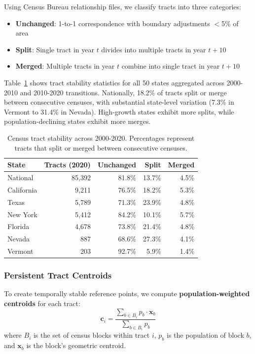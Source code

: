 Using Census Bureau relationship files, we classify tracts into three categories:
\begin{itemize}
    \item \textbf{Unchanged}: 1-to-1 correspondence with boundary adjustments $<$5\% of area
    \item \textbf{Split}: Single tract in year $t$ divides into multiple tracts in year $t+10$
    \item \textbf{Merged}: Multiple tracts in year $t$ combine into single tract in year $t+10$
\end{itemize}

Table~\ref{tab:tract-stability} shows tract stability statistics for all 50 states aggregated across 2000-2010 and 2010-2020 transitions. Nationally, 18.2\% of tracts split or merge between consecutive censuses, with substantial state-level variation (7.3\% in Vermont to 31.4\% in Nevada). High-growth states exhibit more splits, while population-declining states exhibit more merges.

\begin{table}[t]
\centering
\caption{Census tract stability across 2000-2020. Percentages represent tracts that split or merged between consecutive censuses.}
\label{tab:tract-stability}
\begin{tabular}{lrrrr}
\toprule
State & Tracts (2020) & Unchanged & Split & Merged \\
\midrule
National & 85,392 & 81.8\% & 13.7\% & 4.5\% \\
California & 9,211 & 76.5\% & 18.2\% & 5.3\% \\
Texas & 5,789 & 71.3\% & 23.9\% & 4.8\% \\
New York & 5,412 & 84.2\% & 10.1\% & 5.7\% \\
Florida & 4,678 & 73.8\% & 21.4\% & 4.8\% \\
Nevada & 887 & 68.6\% & 27.3\% & 4.1\% \\
Vermont & 203 & 92.7\% & 5.9\% & 1.4\% \\
\bottomrule
\end{tabular}
\end{table}

\subsubsection{Persistent Tract Centroids}

To create temporally stable reference points, we compute \textbf{population-weighted centroids} for each tract:
\[
\mathbf{c}_i = \frac{\sum_{b \in B_i} p_b \cdot \mathbf{x}_b}{\sum_{b \in B_i} p_b}
\]
where $B_i$ is the set of census blocks within tract $i$, $p_b$ is the population of block $b$, and $\mathbf{x}_b$ is the block's geometric centroid.

